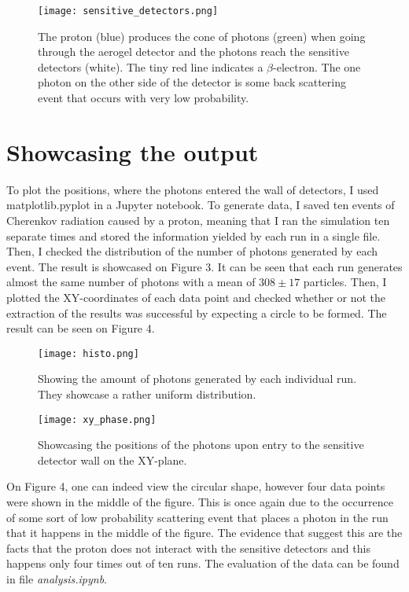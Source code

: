 \documentclass[12pt,twocolumn]{article}
\begin{document}
\begin{figure}[H]
    \centering
    \texttt{[image: sensitive\_detectors.png]}
    \caption{The proton (blue) produces the cone of photons (green) when going through the aerogel detector and the photons reach the sensitive detectors (white). The tiny red line indicates a $\beta$-electron. The one photon on the other side of the detector is some back scattering event that occurs with very low probability.}
    \label{fig:my_label}
\end{figure}

\section{Showcasing the output}

To plot the positions, where the photons entered the wall of detectors, I used matplotlib.pyplot in a Jupyter notebook. To generate data, I saved ten events of Cherenkov radiation caused by a proton, meaning that I ran the simulation ten separate times and stored the information yielded by each run in a single file. Then, I checked the distribution of the number of photons generated by each event. The result is showcased on Figure 3. It can be seen that each run generates almost the same number of photons with a mean of $308\pm17$ particles. Then, I plotted the XY-coordinates of each data point and checked whether or not the extraction of the results was successful by expecting a circle to be formed. The result can be seen on Figure 4.

\begin{figure}[H]
    \centering
    \texttt{[image: histo.png]}
    \caption{Showing the amount of photons generated by each individual run. They showcase a rather uniform distribution.}
    \label{fig:my_label}
\end{figure}
\begin{figure}[H]
    \centering
    \texttt{[image: xy\_phase.png]}
    \caption{Showcasing the positions of the photons upon entry to the sensitive detector wall on the XY-plane.}
    \label{fig:my_label}
\end{figure}

On Figure 4, one can indeed view the circular shape, however four data points were shown in the middle of the figure. This is once again due to the occurrence of some sort of low probability scattering event that places a photon in the run that it happens in the middle of the figure. The evidence that suggest this are the facts that the proton does not interact with the sensitive detectors and this happens only four times out of ten runs. The evaluation of the data can be found in file \emph{analysis.ipynb}. \cite{borbende}
\end{document}
